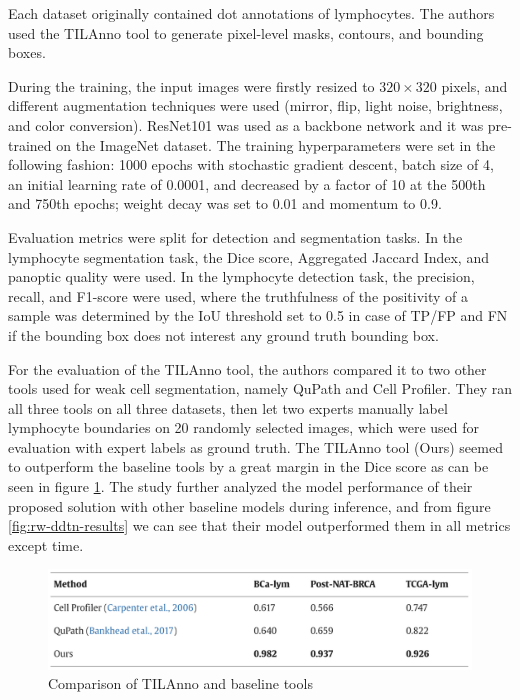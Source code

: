 Each dataset originally contained dot annotations of lymphocytes. The authors used the TILAnno tool to generate pixel-level masks, contours, and bounding boxes.

During the training, the input images were firstly resized to $320\!\times\!320$ pixels, and different augmentation techniques were used (mirror, flip, light noise, brightness, and color conversion). ResNet101 was used as a backbone network and it was pre-trained on the ImageNet dataset. The training hyperparameters were set in the following fashion: 1000 epochs with stochastic gradient descent, batch size of 4, an initial learning rate of 0.0001, and decreased by a factor of 10 at the 500th and 750th epochs; weight decay was set to 0.01 and momentum to 0.9.

Evaluation metrics were split for detection and segmentation tasks. In the lymphocyte segmentation task, the Dice score, Aggregated Jaccard Index, and panoptic quality were used. In the lymphocyte detection task, the precision, recall, and F1-score were used, where the truthfulness of the positivity of a sample was determined by the IoU threshold set to 0.5 in case of TP/FP and FN if the bounding box does not interest any ground truth bounding box.

For the evaluation of the TILAnno tool, the authors compared it to two other tools used for weak cell segmentation, namely QuPath and Cell Profiler. They ran all three tools on all three datasets, then let two experts manually label lymphocyte boundaries on 20 randomly selected images, which were used for evaluation with expert labels as ground truth. The TILAnno tool (Ours) seemed to outperform the baseline tools by a great margin in the Dice score as can be seen in figure \ref{fig:rw-ddtn-tilanno}. The study further analyzed the model performance of their proposed solution with other baseline models during inference, and from figure \ref{fig:rw-ddtn-results} we can see that their model outperformed them in all metrics except time.

\begin{figure}[H]
    \begin{centering}
    \includegraphics[width=14cm]{assets/images/rw-ddtn-tilanno-eval.png}
    \par\end{centering}
    \caption{Comparison of TILAnno and baseline tools}
    \label{fig:rw-ddtn-tilanno}
\end{figure}

